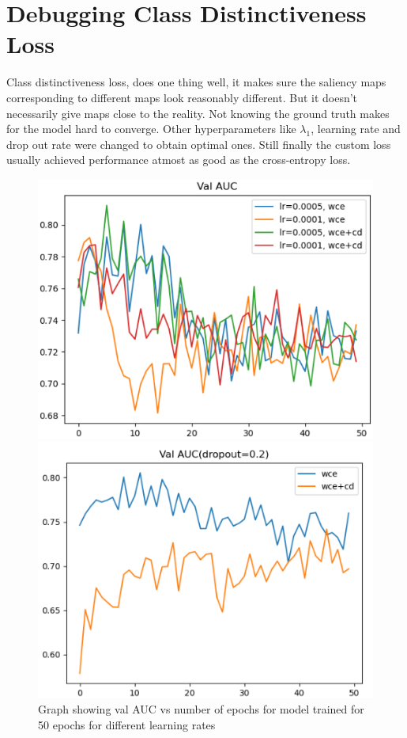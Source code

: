 \section{Debugging Class Distinctiveness Loss}
Class distinctiveness loss, does one thing well, it makes sure the saliency maps corresponding to different maps look reasonably different. But it doesn't necessarily give maps close to the reality. Not knowing the ground truth makes for the model hard to converge.
 Other hyperparameters like $\lambda_1$, learning rate and drop out rate were changed to obtain optimal ones. Still finally the custom loss usually achieved performance atmost as good as the cross-entropy loss.
 \begin{figure}
  \centering
  \begin{minipage}[b]{0.45\textwidth}
    \centering
    \includegraphics[width=\textwidth]{Chapter3/Chapter3Figs/lr.png}
    \caption{Graph showing val AUC vs number of epochs for model trained for 50 epochs for different learning rates}
    \label{fig:lr}
  \end{minipage}
  \hfill
  \begin{minipage}[b]{0.45\textwidth}
    \centering
    \includegraphics[width=\textwidth]{Chapter3/Chapter3Figs/drop.png}

\end{minipage}
\end{figure}
